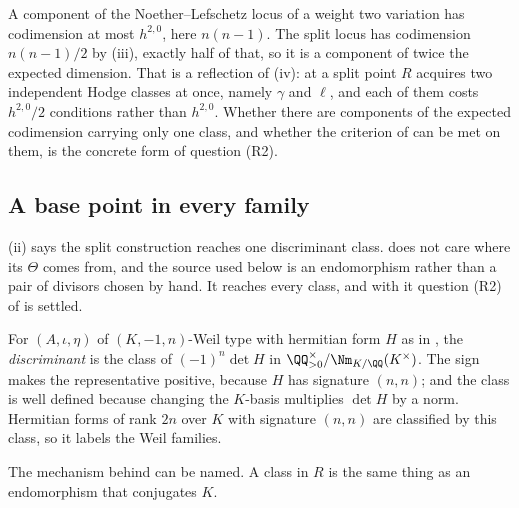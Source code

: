 \begin{remark}
\label{rem:nlcodim}
A component of the Noether--Lefschetz locus of a weight two variation has
codimension at most $h^{2,0}$, here $n(n-1)$. The split locus has codimension
$n(n-1)/2$ by (iii), exactly half of that, so it is a
component of twice the expected dimension. That is a reflection of
(iv): at a split point $R$ acquires two independent Hodge
classes at once, namely $\gamma$ and $\ell$, and each of them costs
$h^{2,0}/2$ conditions rather than $h^{2,0}$. Whether there are components of
the expected codimension carrying only one class, and whether the criterion of
 can be met on them, is the concrete form of question
(R2).
\end{remark}

\subsection{A base point in every family}\label{ssec:everyfamily}

(ii) says the split construction reaches one discriminant
class.  does not care where its $\Theta$ comes from,
and the source used below is an endomorphism rather than a pair of divisors
chosen by hand. It reaches every class, and with it question (R2) of
 is settled.

\begin{definition}[Discriminant]\label{def:disc}
For $(A,\iota,\eta)$ of $(K,-1,n)$-Weil type with hermitian form $H$ as in
, the \emph{discriminant} is the class of
$(-1)^{n}\det H$ in $\QQ^{\times}_{>0}/\Nm_{K/\QQ}(K^{\times})$. The sign
makes the representative positive, because $H$ has signature $(n,n)$; and the
class is well defined because changing the $K$-basis multiplies $\det H$ by a
norm. Hermitian forms of rank $2n$ over $K$ with signature $(n,n)$ are
classified by this class, so it labels the Weil families.
\end{definition}

The mechanism behind  can be named. A class in $R$ is
the same thing as an endomorphism that conjugates $K$.

